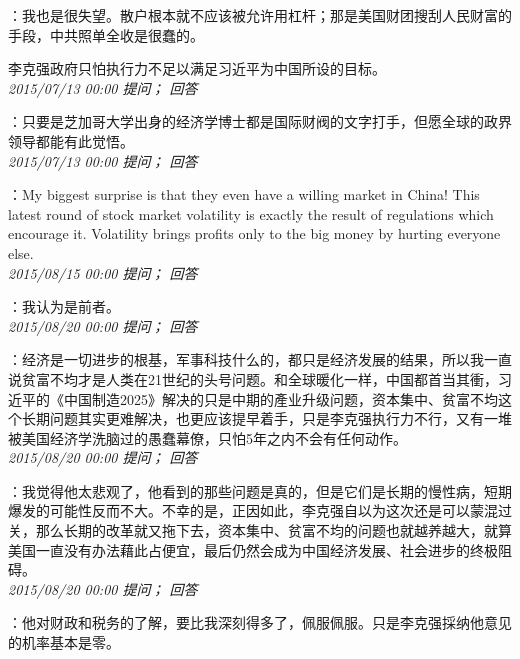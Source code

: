 \documentclass[twocolumn]{ctexart}
\begin{document}
：我也是很失望。散户根本就不应该被允许用杠杆；那是美国财团搜刮人民财富的手段，中共照单全收是很蠢的。

李克强政府只怕执行力不足以满足习近平为中国所设的目标。\\

\textit{\hfill\noindent\small 2015/07/13 00:00 提问； 回答}

：只要是芝加哥大学出身的经济学博士都是国际财阀的文字打手，但愿全球的政界领导都能有此觉悟。\\

\textit{\hfill\noindent\small 2015/07/13 00:00 提问； 回答}

：My biggest surprise is that they even have a willing market in China! This latest round of stock market volatility is exactly the result of regulations which encourage it. Volatility brings profits only to the big money by hurting everyone else.\\

\textit{\hfill\noindent\small 2015/08/15 00:00 提问； 回答}

：我认为是前者。\\

\textit{\hfill\noindent\small 2015/08/20 00:00 提问； 回答}

：经济是一切进步的根基，军事科技什么的，都只是经济发展的结果，所以我一直说贫富不均才是人类在21世纪的头号问题。和全球暖化一样，中国都首当其衝，习近平的《中国制造2025》解决的只是中期的產业升级问题，资本集中、贫富不均这个长期问题其实更难解决，也更应该提早着手，只是李克强执行力不行，又有一堆被美国经济学洗脑过的愚蠢幕僚，只怕5年之内不会有任何动作。\\

\textit{\hfill\noindent\small 2015/08/20 00:00 提问； 回答}

：我觉得他太悲观了，他看到的那些问题是真的，但是它们是长期的慢性病，短期爆发的可能性反而不大。不幸的是，正因如此，李克强自以为这次还是可以蒙混过关，那么长期的改革就又拖下去，资本集中、贫富不均的问题也就越养越大，就算美国一直没有办法藉此占便宜，最后仍然会成为中国经济发展、社会进步的终极阻碍。\\

\textit{\hfill\noindent\small 2015/08/20 00:00 提问； 回答}

：他对财政和税务的了解，要比我深刻得多了，佩服佩服。只是李克强採纳他意见的机率基本是零。\\
\end{document}
